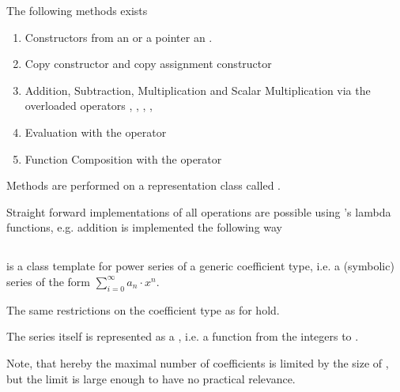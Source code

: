 			The following methods exists
			\begin{enumerate}
				\item Constructors from an  or a pointer an .
				\item  Copy constructor  and copy assignment constructor 
				\item Addition, Subtraction, Multiplication and Scalar Multiplication via the overloaded operators \code{+}, \code{-}, 	\code{*}, \code{+=}, \code{*=}
				\item Evaluation with the operator \code{()}
				\item Function Composition with the operator \code{()}
			\end{enumerate}
			Methods are performed on a representation class called .
      
      Straight forward implementations of all operations are possible using {\ccx}'s lambda functions, e.g. addition is implemented the following way
			
		\subsection{\powerseries}
			\textbf{} is a class template for power series of a generic coefficient type, 
			i.e. a (symbolic) series of the form $ \sum_{i=0}^\infty a_n \cdot x^n$.

			The same restrictions on the coefficient type as for \poly hold.
			
			The series itself is represented as a , i.e. a function from the integers to .
      
      Note, that hereby the maximal number of coefficients is limited by the size of , 
			but the limit is large enough to have no practical relevance.   

